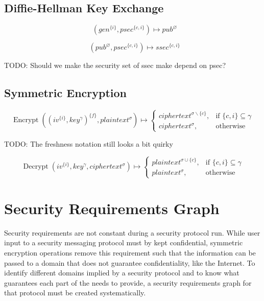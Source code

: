 \documentclass[a4paper]{article}
\DeclareMathOperator{\enc}{Encrypt}
\DeclareMathOperator{\dec}{Decrypt}
\DeclareMathOperator{\dhsec}{DH_{Sec}}
\DeclareMathOperator{\dhpub}{DH_{Pub}}
\newcommand{\TODO}[1]{\small\noindent\color{red} TODO: #1\color{black}}
\newcommand{\emptysec}{\varnothing}
\newcommand{\secminus}{\smallsetminus}
\begin{document}
\subsection{Diffie-Hellman Key Exchange}

$$\dhpub(gen^{\{i\}}, psec^{\{c,i\}}) \mapsto pub^\emptysec$$

$$\dhsec(pub^\emptysec, psec^{\{c,i\}}) \mapsto ssec^{\{c,i\}} $$

\TODO{Should we make the security set of ssec make depend on psec?}

\subsection{Symmetric Encryption}

\begin{equation*}
    \enc((iv^{\{i\}}, key^\gamma)^{\{f\}}, plaintext^\sigma) \mapsto
    \begin{cases}
        ciphertext^{\sigma\secminus\{c\}}, & \text{if $\{c,i\} \subseteq \gamma$} \\
        ciphertext^{\sigma},               & \text{otherwise}
    \end{cases}
\end{equation*}

\TODO{The freshness notation still looks a bit quirky}

\begin{equation*}
    \dec(iv^{\{i\}}, key^\gamma, ciphertext^\sigma) \mapsto
    \begin{cases}
        plaintext^{\sigma\cup\{c\}}, & \text{if $\{c,i\} \subseteq \gamma$} \\
        plaintext^{\sigma},          & \text{otherwise}
    \end{cases}
\end{equation*}

\section{Security Requirements Graph}

Security requirements are not constant during a security protocol run. While
user input to a security messaging protocol must by kept confidential,
symmetric encryption operations remove this requirement such that the
information can be passed to a domain that does not guarantee confidentiality,
like the Internet. To identify different domains implied by a security protocol
and to know what guarantees each part of the needs to provide, a security
requirements graph for that protocol must be created systematically.
\end{document}
